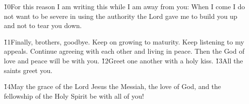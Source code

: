 \v{10}For this reason I am writing this while I am away from you: When I come I do not want to be severe in using the authority the Lord gave me to build you up and not to tear you down.

\v{11}Finally, brothers, goodbye. Keep on growing to maturity. Keep listening to my appeals. Continue agreeing with each other and living in peace. Then the God of love and peace will be with you. \v{12}Greet one another with a holy kiss. \v{13}All the saints greet you.

\v{14}May the grace of the Lord Jesus the Messiah, the love of God, and the fellowship of the Holy Spirit be with all of you!
